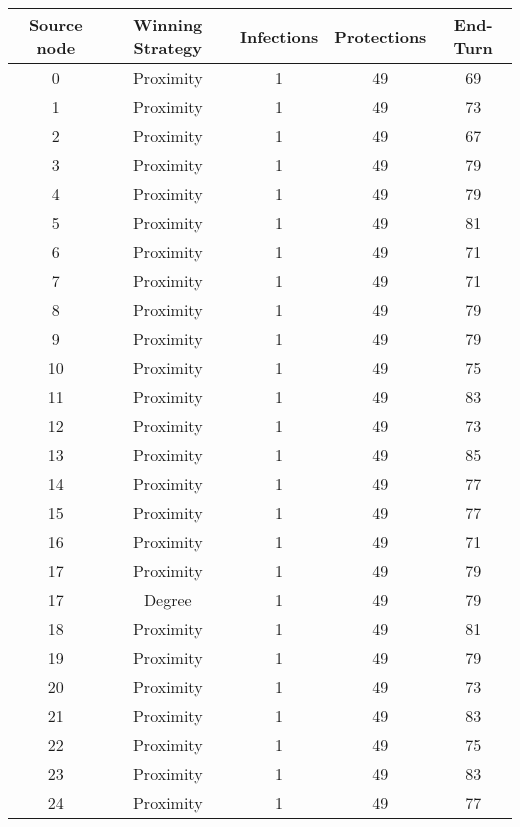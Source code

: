 \documentclass[results.tex]{subfiles}
\begin{document}
\begin{center}
  \begin{tabular}{| c || c | c | c | c |}
    \hline
    {\bfseries Source node} & {\bfseries Winning Strategy} & {\bfseries Infections} & {\bfseries Protections} & {\bfseries End-Turn} \\  %
    \hline\hline
    0 & Proximity & 1 & 49 & 69 \\ 
    \hline
    1 & Proximity & 1 & 49 & 73 \\ 
    \hline
    2 & Proximity & 1 & 49 & 67 \\ 
    \hline
    3 & Proximity & 1 & 49 & 79 \\ 
    \hline
    4 & Proximity & 1 & 49 & 79 \\ 
    \hline
    5 & Proximity & 1 & 49 & 81 \\ 
    \hline
    6 & Proximity & 1 & 49 & 71 \\ 
    \hline
    7 & Proximity & 1 & 49 & 71 \\ 
    \hline
    8 & Proximity & 1 & 49 & 79 \\ 
    \hline
    9 & Proximity & 1 & 49 & 79 \\ 
    \hline
    10 & Proximity & 1 & 49 & 75 \\ 
    \hline
    11 & Proximity & 1 & 49 & 83 \\ 
    \hline
    12 & Proximity & 1 & 49 & 73 \\ 
    \hline
    13 & Proximity & 1 & 49 & 85 \\ 
    \hline
    14 & Proximity & 1 & 49 & 77 \\ 
    \hline
    15 & Proximity & 1 & 49 & 77 \\ 
    \hline
    16 & Proximity & 1 & 49 & 71 \\ 
    \hline
    17 & Proximity & 1 & 49 & 79 \\ 
    \hline
    17 & Degree & 1 & 49 & 79 \\ 
    \hline
    18 & Proximity & 1 & 49 & 81 \\ 
    \hline
    19 & Proximity & 1 & 49 & 79 \\ 
    \hline
    20 & Proximity & 1 & 49 & 73 \\ 
    \hline
    21 & Proximity & 1 & 49 & 83 \\ 
    \hline
    22 & Proximity & 1 & 49 & 75 \\ 
    \hline
    23 & Proximity & 1 & 49 & 83 \\ 
    \hline
    24 & Proximity & 1 & 49 & 77 \\ 

\end{tabular}
\end{center}
\end{document}
